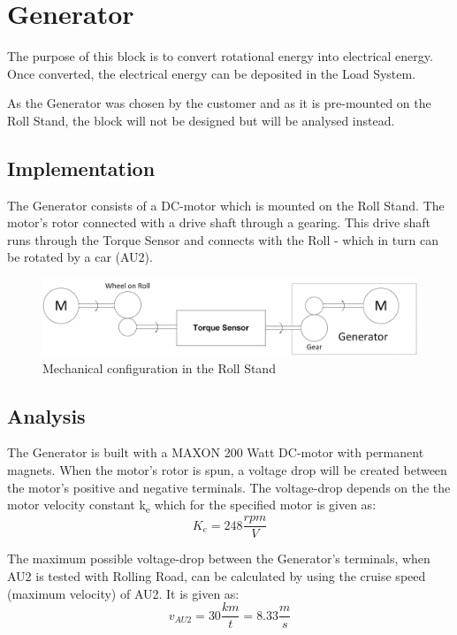 \section{Generator}
The purpose of this block is to convert rotational energy into electrical energy. Once converted, the electrical energy can be deposited in the Load System.

As the Generator was chosen by the customer and as it is pre-mounted on the Roll Stand, the block will not be designed but will be analysed instead.

\subsection{Implementation}
The Generator consists of a DC-motor which is mounted on the Roll Stand. The motor's rotor connected with a drive shaft through a gearing. This drive shaft runs through the Torque Sensor and connects with the Roll - which in turn can be rotated by a car (AU2).

\begin{figure}[H]
	\centering
	\includegraphics[width=1\linewidth]{Hardware/Pictures/Mechanical_Connections}
	\caption{Mechanical configuration in the Roll Stand}
	\label{fig:Generator_Implementation}
\end{figure}

\subsection{Analysis}
The Generator is built with a MAXON 200 Watt DC-motor with permanent magnets. When the motor's rotor is spun, a voltage drop will be created between the motor's positive and negative terminals. The voltage-drop depends on the the motor velocity constant k\textsubscript{e} which for the specified motor is given as:
\begin{equation}
	K_e = 248 \frac{rpm}{V}
\end{equation}

The maximum possible voltage-drop between the Generator's terminals, when AU2 is tested with Rolling Road, can be calculated by using the cruise speed (maximum velocity) of AU2. It is given as:
\begin{equation}
	v_{AU2} = 30 \frac{km}{t} = 8.33 \frac{m}{s}
\end{equation}

